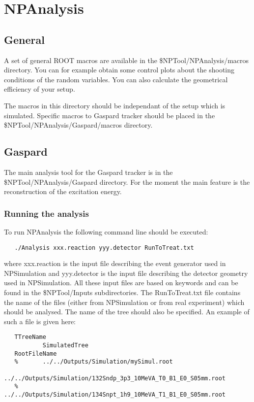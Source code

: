 \documentclass[a4paper,12pt]{article}
\begin{document}
\section{NPAnalysis}
\subsection{General}
A set of general ROOT macros are available in the \$NPTool/NPAnalysis/macros 
directory. You can for example obtain some control plots about the shooting
conditions of the random variables. You can also calculate the geometrical 
efficiency of your setup.

The macros in this directory should be independant of the setup which is simulated.
Specific macros to Gaspard tracker should be placed in the 
\$NPTool/NPAnalysis/Gaspard/macros directory.


\subsection{Gaspard}
The main analysis tool for the Gaspard tracker is in the \$NPTool/NPAnalysis/Gaspard
directory. For the moment the main feature is the reconstruction of the excitation 
energy.

\subsubsection{Running the analysis}
To run NPAnalysis the following command line should be executed:

\begin{verbatim}
   ./Analysis xxx.reaction yyy.detector RunToTreat.txt
\end{verbatim}

where xxx.reaction is the input file describing the event generator used in 
NPSimulation and yyy.detector is the input file describing the detector geometry
used in NPSimulation. All these input files are based on keywords and can be found 
in the \$NPTool/Inputs subdirectories. The RunToTreat.txt file contains the
name of the files (either from NPSimulation or from real experiment) which should
be analysed. The name of the tree should also be specified. An example 
of such a file is given here:

\begin{verbatim}
   TTreeName
           SimulatedTree
   RootFileName
   %       ../../Outputs/Simulation/mySimul.root
           ../../Outputs/Simulation/132Sndp_3p3_10MeVA_T0_B1_E0_S05mm.root
   %       ../../Outputs/Simulation/134Snpt_1h9_10MeVA_T1_B1_E0_S05mm.root
\end{verbatim}
\end{document}
